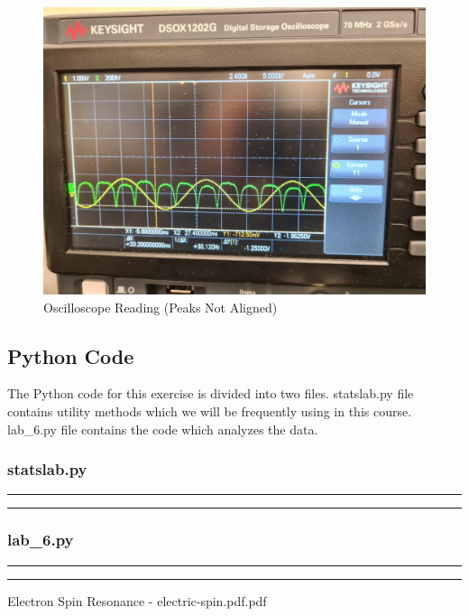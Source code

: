 \documentclass[letterpaper,12pt]{article}
\begin{document}
\begin{figure}[H]
  \centering
  \includegraphics[width=1.0\linewidth]{../Fredrik/osc-p-not-aligned.jpg}    
  \begin{center}
    \begin{center}   
    \end{center}  \end{center}
  \caption{Oscilloscope Reading (Peaks Not Aligned)}
  \label{osc}
\end{figure}

\pagebreak

\subsection{Python Code}

The Python code for this exercise is divided into two files. statslab.py file contains utility methods
which we will be frequently using in this course. lab\_6.py file contains the code which analyzes
the data.

\subsubsection{statslab.py}
\noindent\rule{\textwidth}{1pt}

\noindent\rule{\textwidth}{1pt}

\pagebreak

\subsubsection{lab\_6.py}
\noindent\rule{\textwidth}{1pt}

\noindent\rule{\textwidth}{1pt}

\pagebreak

\begin{thebibliography}{99}

 Electron Spin Resonance - electric-spin.pdf.pdf

\end{thebibliography}
\end{document}
